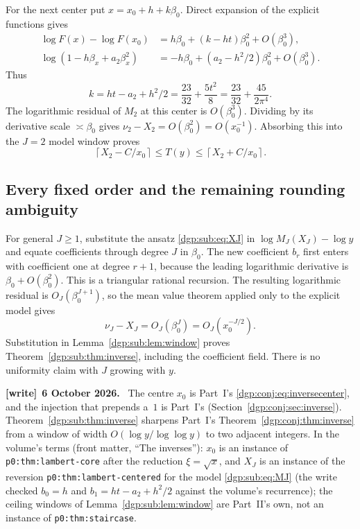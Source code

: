 \documentclass[11pt,letterpaper]{article}
\numberwithin{equation}{section}
\theoremstyle{remark}\newtheorem{remark}[theorem]{Remark}
\newcommand{\ceil}[1]{\left\lceil #1\right\rceil}
\newcommand{\file}[1]{\nolinkurl{#1}}
\newenvironment{writenote}[1][]{\par\smallskip\begingroup\small
 \noindent\textbf{[write]}\if\relax\detokenize{#1}\relax\else~\textbf{#1.}\fi\ }%
 {\par\endgroup\smallskip}
\begin{document}
For the next center put $x=x_0+h+k\beta_0$. Direct expansion of
the explicit functions gives
\begin{align}
 \log F(x)-\log F(x_0)&=h\beta_0+(k-ht)\beta_0^2+O(\beta_0^3),\nonumber\\
 \log(1-h\beta_x+a_2\beta_x^2)&=-h\beta_0
             +(a_2-h^2/2)\beta_0^2+O(\beta_0^3).\label{dgp:sub:eq:centercancel}
\end{align}
Thus
\[
 k=ht-a_2+h^2/2=\frac{23}{32}+\frac{5t^2}8
               =\frac{23}{32}+\frac{45}{2\pi^4}.
\]
The logarithmic residual of $M_2$ at this center is $O(\beta_0^3)$.
Dividing by its derivative scale $\asymp\beta_0$ gives
$\nu_2-X_2=O(\beta_0^2)=O(x_0^{-1})$. Absorbing this into the
$J=2$ model window proves
\begin{equation}\label{dgp:sub:eq:X2window}
 \ceil{X_2-C/x_0}\leq T(y)\leq\ceil{X_2+C/x_0}.
\end{equation}

\subsection{Every fixed order and the remaining rounding ambiguity}
For general $J\geq1$, substitute the ansatz \eqref{dgp:sub:eq:XJ} in
$\log M_J(X_J)-\log y$ and equate coefficients through degree $J$
in $\beta_0$. The new coefficient $b_r$ first enters with coefficient
one at degree $r+1$, because the leading logarithmic derivative is
$\beta_0+O(\beta_0^2)$. This is a triangular rational recursion.
The resulting logarithmic residual is $O_J(\beta_0^{J+1})$,
so the mean value theorem applied only to the explicit model gives
\[
 \nu_J-X_J=O_J(\beta_0^J)=O_J(x_0^{-J/2}).
\]
Substitution in Lemma~\ref{dgp:sub:lem:window} proves
Theorem~\ref{dgp:sub:thm:inverse}, including the coefficient field.
There is no uniformity claim with $J$ growing with $y$.
\begin{writenote}[6 October 2026]
The centre $x_0$ is Part~I's \eqref{dgp:conj:eq:inversecenter}, and the injection that prepends a~$1$ is Part~I's (Section~\ref{dgp:conj:sec:inverse}). Theorem~\ref{dgp:sub:thm:inverse} sharpens Part~I's Theorem~\ref{dgp:conj:thm:inverse} from a window of width $O(\log y/\log\log y)$ to two adjacent integers. In the volume's terms (front matter, ``The inverses''): $x_0$ is an instance of \file{p0:thm:lambert-core} after the reduction $\xi=\sqrt x$, and $X_J$ is an instance of the reversion \file{p0:thm:lambert-centered} for the model \eqref{dgp:sub:eq:MJ} (the write checked $b_0=h$ and $b_1=ht-a_2+h^2/2$ against the volume's recurrence); the ceiling windows of Lemma~\ref{dgp:sub:lem:window} are Part~II's own, not an instance of \file{p0:thm:staircase}.
\end{writenote}
\end{document}
